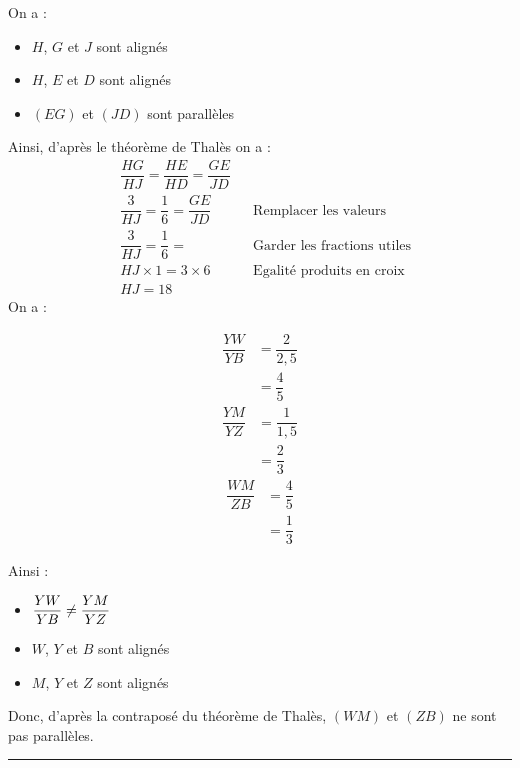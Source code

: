 \begin{multicols}{2}
    \exo{}{} On a :
    \begin{itemize}
      \item $H$, $G$ et $J$ sont alignés
      \item $H$, $E$ et $D$ sont alignés
      \item $(EG)$ et $(JD)$ sont parallèles
    \end{itemize}
    Ainsi, d'après le théorème de Thalès on a :
    \begin{align*}
      &\dfrac{HG}{HJ}=\dfrac{HE}{HD}=\dfrac{GE}{JD}&&\\
      &\dfrac{3}{HJ}=\dfrac{1}{6}=\dfrac{GE}{JD}&&\text{Remplacer les valeurs}\\
      &\dfrac{3}{HJ}=\dfrac{1}{6}=&&\text{Garder les fractions utiles}\\
      &HJ\times 1=3\times 6 &&\text{Egalité produits en croix}\\
      &HJ=18
    \end{align*}
    \exo{}{} On a : \vspace{-0.5em}
    \begin{multicols}{3}
        \noindent
        \begin{align*}
            \dfrac{YW}{YB}&=\dfrac{2}{2,5}\\
            &=\dfrac{4}{5}
        \end{align*}
        \begin{align*}
            \dfrac{YM}{YZ}&=\dfrac{1}{1,5}\\
            &=\dfrac{2}{3}
        \end{align*}
        \begin{align*}
            \dfrac{WM}{ZB}&=\dfrac{4}{5}\\
            &=\dfrac{1}{3}
        \end{align*}
    \end{multicols}
    \vspace{-1.75em }
    Ainsi :
    \begin{itemize}
        \item $\dfrac{YW}{YB}\neq\dfrac{YM}{YZ}\vspace{0.25em}$
        \item $W$, $Y$ et $B$ sont alignés
        \item $M$, $Y$ et $Z$ sont alignés
    \end{itemize}
    Donc, d'après la contraposé du théorème de Thalès, $(WM)$ et $(ZB)$ ne sont pas parallèles.
  \end{multicols}
\hrule \vspace{-0.5em}%

